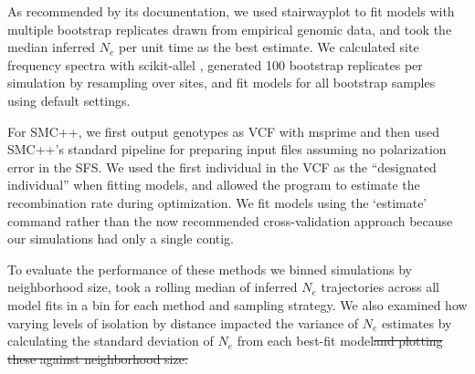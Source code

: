 \documentclass[10pt,twoside,lineno,hidelinks]{preprint} %
\providecommand{\DIFadd}[1]{{\protect\color{blue}\uwave{#1}}} %
\providecommand{\DIFdel}[1]{{\protect\color{red}\sout{#1}}}                      %
\providecommand{\DIFaddbegin}{} %
\providecommand{\DIFaddend}{} %
\providecommand{\DIFdelbegin}{} %
\providecommand{\DIFdelend}{} %
\begin{document}
As recommended by its documentation, we used stairwayplot to fit models with multiple bootstrap replicates drawn from empirical genomic data, and took the median inferred $N_{e}$ per unit time as the best estimate. We calculated site frequency spectra with scikit-allel \citep{Miles2017}, generated 100 bootstrap replicates per simulation by resampling over sites, and fit models for all bootstrap samples using default settings.

For SMC++, we first output genotypes as VCF with msprime and then used SMC++'s standard pipeline for preparing input files assuming no polarization error in the SFS. We used the first individual in the VCF as the ``designated individual'' when fitting models, and allowed the program to estimate the recombination rate during optimization. We fit models using the `estimate' command rather than the now recommended cross-validation approach because our simulations had only a single contig. 

To evaluate the performance of these methods we binned simulations by neighborhood size, took a rolling median of inferred $N_{e}$ trajectories across all model fits in a bin for each method and sampling strategy.  We also examined how varying levels of isolation by distance impacted the variance of $N_{e}$ estimates by calculating the standard deviation of $N_{e}$ from each best-fit model\DIFdelbegin \DIFdel{and plotting these against neighborhood size. }\DIFdelend \DIFaddbegin \DIFadd{. %
}\DIFaddend 

\end{document}
